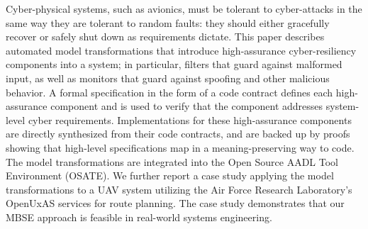 Cyber-physical systems, such as avionics, must be tolerant to
cyber-attacks in the same way they are tolerant to random faults: they
should either gracefully recover or safely shut down as requirements dictate.
%
%
This paper describes automated model transformations that introduce
high-assurance cyber-resiliency components into a system; in
particular, filters that guard against malformed input, as well as
monitors that guard against spoofing and other malicious behavior. A
formal specification in the form of a code contract defines each
high-assurance component and is used to verify that the component
addresses system-level cyber requirements. Implementations for these
high-assurance components are directly synthesized from their code
contracts, and are backed up by proofs showing that high-level
specifications map in a meaning-preserving way to code. The model
transformations are integrated into the Open Source AADL Tool
Environment (OSATE). 
We further report a case study applying the model
transformations to a UAV system
utilizing the Air Force Research Laboratory's OpenUxAS services for
route planning.  The case study
demonstrates that our MBSE approach is feasible in real-world systems
engineering.


